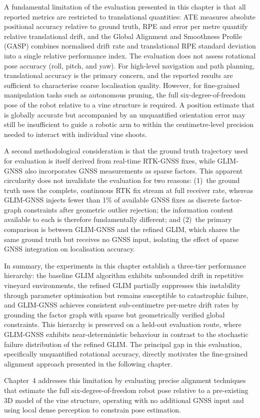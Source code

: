 A fundamental limitation of the evaluation presented in this chapter is that all reported metrics are restricted to translational quantities: ATE measures absolute positional accuracy relative to ground truth, RPE and error per metre quantify relative translational drift, and the Global Alignment and Smoothness Profile (GASP) combines normalised drift rate and translational RPE standard deviation into a single relative performance index. The evaluation does not assess rotational pose accuracy (roll, pitch, and yaw). For high-level navigation and path planning, translational accuracy is the primary concern, and the reported results are sufficient to characterise coarse localisation quality. However, for fine-grained manipulation tasks such as autonomous pruning, the full six-degree-of-freedom pose of the robot relative to a vine structure is required. A position estimate that is globally accurate but accompanied by an unquantified orientation error may still be insufficient to guide a robotic arm to within the centimetre-level precision needed to interact with individual vine shoots.

A second methodological consideration is that the ground truth trajectory used for evaluation is itself derived from real-time RTK-GNSS fixes, while GLIM-GNSS also incorporates GNSS measurements as sparse factors. This apparent circularity does not invalidate the evaluation for two reasons: (1)~the ground truth uses the complete, continuous RTK fix stream at full receiver rate, whereas GLIM-GNSS injects fewer than 1\% of available GNSS fixes as discrete factor-graph constraints after geometric outlier rejection; the information content available to each is therefore fundamentally different; and (2)~the primary comparison is between GLIM-GNSS and the refined GLIM, which shares the same ground truth but receives no GNSS input, isolating the effect of sparse GNSS integration on localisation accuracy.

In summary, the experiments in this chapter establish a three-tier performance hierarchy: the baseline GLIM algorithm exhibits unbounded drift in repetitive vineyard environments, the refined GLIM partially suppresses this instability through parameter optimisation but remains susceptible to catastrophic failure, and GLIM-GNSS achieves consistent sub-centimetre per-metre drift rates by grounding the factor graph with sparse but geometrically verified global constraints. This hierarchy is preserved on a held-out evaluation route, where GLIM-GNSS exhibits near-deterministic behaviour in contrast to the stochastic failure distribution of the refined GLIM. The principal gap in this evaluation, specifically unquantified rotational accuracy, directly motivates the fine-grained alignment approach presented in the following chapter.

Chapter~4 addresses this limitation by evaluating precise alignment techniques that estimate the full six-degree-of-freedom robot pose relative to a pre-existing 3D model of the vine structure, operating with no additional GNSS input and using local dense perception to constrain pose estimation.